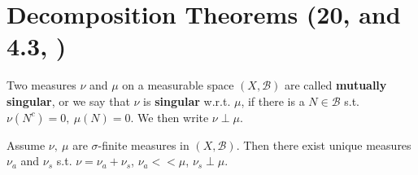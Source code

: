 \section{Decomposition Theorems \tiny{(20, \cite{schilling2017measures} and 4.3, \cite{Gerald_Teschl})}}
\begin{definition}
    Two measures \(\nu\) and \(\mu\) on a measurable space \((X,\mathscr{B})\) are called \textbf{mutually singular}, or we say that \(\nu\) is \textbf{singular} w.r.t. \(\mu\), if there is a \(N\in\mathscr{B}\) s.t. \(\nu(N^c)=0, \ \mu(N)=0\). We then write \(\nu \perp \mu\).
\end{definition}
\begin{theorem}
    Assume \(\nu,\ \mu\) are \(\sigma\)-finite measures in \((X,\mathscr{B})\). Then there exist unique measures \(\nu_a\) and \(\nu_s\) s.t. \(\nu = \nu_a + \nu_s\), \(\nu_a << \mu\), \(\nu_s \perp \mu\).
\end{theorem}
\ifdetailed
